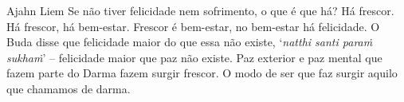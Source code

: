 
\begin{quotepage}{0.52\linewidth}{Ajahn Liem}
Se não tiver felicidade nem sofrimento, o que é que há? Há frescor. Há
frescor, há bem-estar. Frescor é bem-estar, no bem-estar há felicidade.
O Buda disse que felicidade maior do que essa não existe,
‘\textit{natthi santi paraṁ sukhaṁ}’ – felicidade maior que
paz não existe. Paz exterior e paz mental que fazem parte do Darma
fazem surgir frescor. O modo de ser que faz surgir aquilo que chamamos de darma.
\end{quotepage}

